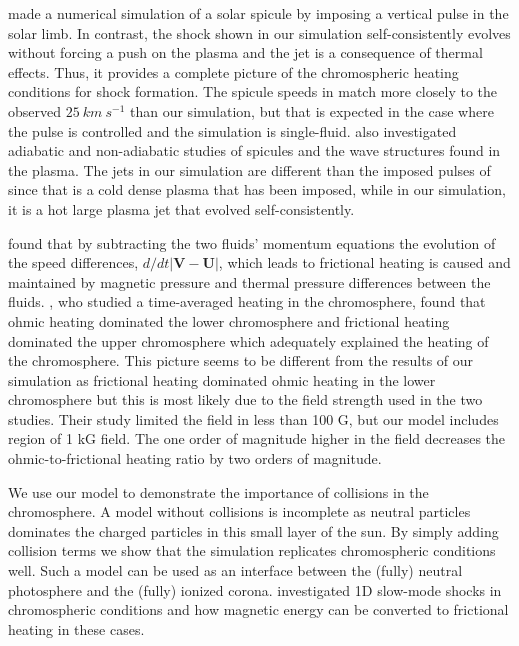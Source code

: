 \documentclass[12pt,upcase]{umlthesis}
\begin{document}
\citet{KuzmaApJ2017} made a numerical simulation of a solar spicule by imposing a vertical pulse in the solar limb. In contrast, the shock shown in our simulation self-consistently evolves without forcing a push on the plasma and the jet is a consequence of thermal effects. Thus, it provides a complete picture of the chromospheric heating conditions for shock formation. The spicule speeds in \citet{KuzmaApJ2017} match more closely to the observed $25~km~s^{-1}$ than our simulation, but that is expected in the case where the pulse is controlled and the simulation is single-fluid. \citet{KuzmaApJ2017} also investigated adiabatic and non-adiabatic studies of spicules and the wave structures found in the plasma. The jets in our simulation are different than the imposed pulses of~\citet{Kuzma2017} since that is a cold dense plasma that has been imposed, while in our simulation, it is a hot large plasma jet that evolved self-consistently.

\citet{Song2014} found that by subtracting the two fluids' momentum equations the evolution of the speed differences, $d/dt|\textbf{V}-\textbf{U}|$, which leads to frictional heating is caused and maintained by magnetic pressure and thermal pressure differences between the fluids. \citet{Tu2013}, who studied a time-averaged heating in the chromosphere, found that ohmic heating dominated the lower chromosphere and frictional heating dominated the upper chromosphere which adequately explained the heating of the chromosphere. This picture seems to be different from the results of our simulation as frictional heating dominated ohmic heating in the lower chromosphere but this is most likely due to the field strength used in the two studies. Their study limited the field in less than 100 G, but our model includes region of 1 kG field. The one order of magnitude higher in the field decreases the ohmic-to-frictional heating ratio by two orders of magnitude.

We use our model to demonstrate the importance of collisions in the chromosphere. A model without collisions is incomplete as neutral particles dominates the charged particles in this small layer of the sun. By simply adding collision terms we show that the simulation replicates chromospheric conditions well. Such a model can be used as an interface between the (fully) neutral photosphere and the (fully) ionized corona. \citet{Hillier2016} investigated 1D slow-mode shocks in chromospheric conditions and how magnetic energy can be converted to frictional heating in these cases.
\end{document}

